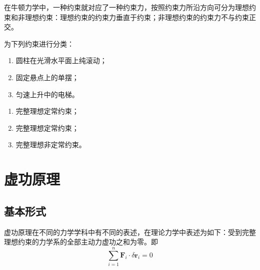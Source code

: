     在牛顿力学中，一种约束就对应了一种约束力，按照约束力所沿方向可分为理想约束和非理想约束：理想约束的约束力垂直于约束；非理想约束的约束力不与约束正交。
    \begin{example}
        为下列约束进行分类：
        \begin{enumerate}
            \item 圆柱在光滑水平面上纯滚动；
            \item 固定悬点上的单摆；
            \item 匀速上升中的电梯。
        \end{enumerate}
    \end{example}
    \begin{solution}
        \begin{enumerate}
            \item 完整理想定常约束；
            \item 完整理想定常约束；
            \item 完整理想非定常约束。
        \end{enumerate}
    \end{solution}

    \section{虚功原理}
        \subsection{基本形式}
        虚功原理在不同的力学学科中有不同的表述，在理论力学中表述为如下：受到完整理想约束的力学系的全部主动力虚功之和为零。即
        \begin{equation}
            \label{虚功原理基本形式}
            \sum_{i=1}^{n}\bm{F}_i\cdot\delta\bm{r}_i=0
        \end{equation}

